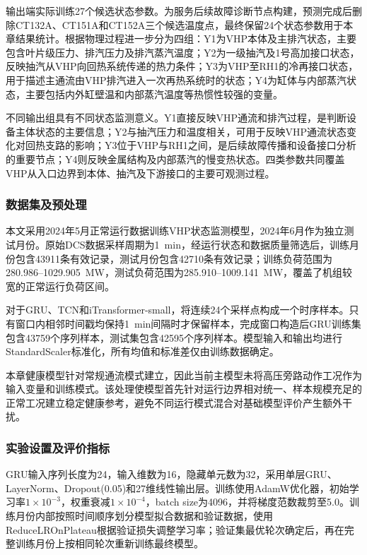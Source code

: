 输出端实际训练27个候选状态参数。为服务后续故障诊断节点构建，预测完成后删除CT132A、CT151A和CT152A三个候选温度点，最终保留24个状态参数用于本章结果统计。根据物理过程进一步分为四组：Y1为VHP本体及主排汽状态，主要包含叶片级压力、排汽压力及排汽蒸汽温度；Y2为一级抽汽及1号高加接口状态，反映抽汽从VHP向回热系统传递的热力条件；Y3为VHP至RH1的冷再接口状态，用于描述主通流由VHP排汽进入一次再热系统时的状态；Y4为缸体与内部蒸汽状态，主要包括内外缸壁温和内部蒸汽温度等热惯性较强的变量。

不同输出组具有不同状态监测意义。Y1直接反映VHP通流和排汽过程，是判断设备主体状态的主要信息；Y2与抽汽压力和温度相关，可用于反映VHP通流状态变化对回热支路的影响；Y3位于VHP与RH1之间，是后续故障传播和设备接口分析的重要节点；Y4则反映金属结构及内部蒸汽的慢变热状态。四类参数共同覆盖VHP从入口边界到本体、抽汽及下游接口的主要可观测过程。

\subsubsection{数据集及预处理}

本文采用2024年5月正常运行数据训练VHP状态监测模型，2024年6月作为独立测试月份。原始DCS数据采样周期为1~min，经运行状态和数据质量筛选后，训练月份包含43911条有效记录，测试月份包含42710条有效记录；训练负荷范围为280.986--1029.905~MW，测试负荷范围为285.910--1009.141~MW，覆盖了机组较宽的正常运行负荷区间。

对于GRU、TCN和iTransformer-small，将连续24个采样点构成一个时序样本。只有窗口内相邻时间戳均保持1~min间隔时才保留样本，完成窗口构造后GRU训练集包含43759个序列样本，测试集包含42595个序列样本。模型输入和输出均进行StandardScaler标准化，所有均值和标准差仅由训练数据确定。

本章健康模型针对常规通流模式建立，因此当前主模型未将高压旁路动作工况作为输入变量和训练模式。该处理使模型首先针对运行边界相对统一、样本规模充足的正常工况建立稳定健康参考，避免不同运行模式混合对基础模型评价产生额外干扰。

\subsubsection{实验设置及评价指标}

GRU输入序列长度为24，输入维数为16，隐藏单元数为32，采用单层GRU、LayerNorm、Dropout(0.05)和27维线性输出层。训练使用AdamW优化器，初始学习率$1\times10^{-3}$，权重衰减$1\times10^{-4}$，batch size为4096，并将梯度范数裁剪至5.0。训练月份内部按照时间顺序划分模型拟合数据和验证数据，使用ReduceLROnPlateau根据验证损失调整学习率；验证集最优轮次确定后，再在完整训练月份上按相同轮次重新训练最终模型。


